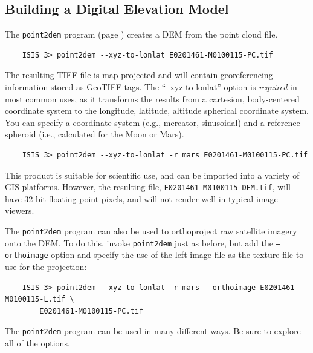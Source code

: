 \subsection{Building a Digital Elevation Model}

The \texttt{point2dem} program (page \pageref{point2dem}) creates a
\ac{DEM} from the point cloud file.

\begin{verbatim}
    ISIS 3> point2dem --xyz-to-lonlat E0201461-M0100115-PC.tif
\end{verbatim}

\noindent
The resulting TIFF file is map projected and will contain
georeferencing information stored as GeoTIFF tags.  The
``--xyz-to-lonlat'' option is {\em required} in most common uses, as
it transforms the results from a cartesion, body-centered coordinate
system to the longitude, latitude, altitude spherical coordinate
system.  You can specify a coordinate system (e.g., mercator,
sinusoidal) and a reference spheroid (i.e., calculated for the Moon or
Mars).

\begin{verbatim}
    ISIS 3> point2dem --xyz-to-lonlat -r mars E0201461-M0100115-PC.tif
\end{verbatim}

\noindent
This product is suitable for scientific use, and can be imported into
a variety of GIS platforms.  However, the resulting file,
\texttt{E0201461-M0100115-DEM.tif}, will have 32-bit floating point
pixels, and will not render well in typical image viewers.

The \texttt{point2dem} program can also be used to orthoproject raw
satellite imagery onto the \ac{DEM}. To do this, invoke
\texttt{point2dem} just as before, but add the \texttt{--orthoimage}
option and specify the use of the left image file as the texture file
to use for the projection:

\begin{verbatim}
    ISIS 3> point2dem --xyz-to-lonlat -r mars --orthoimage E0201461-M0100115-L.tif \
        E0201461-M0100115-PC.tif
\end{verbatim}

\noindent
The \texttt{point2dem} program can be used in many different ways.  Be
sure to explore all of the options.

